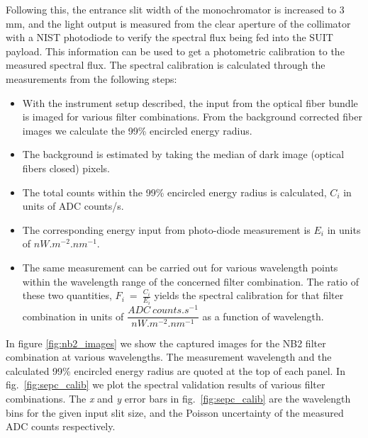 \documentclass[12pt]{spieman}  %
\begin{document}
Following this, the entrance slit width of the monochromator is increased to 3 mm, and the light output is measured from the clear aperture of the collimator with a NIST photodiode to verify the spectral flux being fed into the SUIT payload. This information can be used to get a photometric calibration to the measured spectral flux. The spectral calibration is calculated through the measurements from the following steps:

 \begin{itemize}
 \item With the instrument setup described, the input from the optical fiber bundle is imaged for various filter combinations. From the background corrected fiber images we calculate the 99\% encircled energy radius.
 \item The background is estimated by taking the median of dark image (optical fibers closed) pixels.
 \item The total counts within the 99\% encircled energy radius is calculated, $C_{i}$ in units of ADC counts/s.
 \item The corresponding energy input from photo-diode measurement is $E_{i}$ in units of $nW.m^{-2}.nm^{-1}$.
 \item The same measurement can be carried out for various wavelength points within the wavelength range of the concerned filter combination. The ratio of these two quantities, $F_{i}~=~\frac{C_{i}}{E_{i}}$ 
 yields the spectral calibration for that filter combination in units of $\dfrac{ADC~counts.s^{-1}}{nW.m^{-2}.nm^{-1}}$ as a function of wavelength.
 \end{itemize}

In figure \ref{fig:nb2_images} we show the captured images for the NB2 filter combination at various wavelengths. The measurement wavelength and the calculated 99\% encircled energy radius are quoted at the top of each panel.  In fig.~\ref{fig:sepc_calib} we plot the spectral validation results of various filter combinations. The \textit{x} and \textit{y} error bars in fig.~\ref{fig:sepc_calib} are the wavelength bins for the given input slit size, and the Poisson uncertainty of the measured ADC counts respectively.
\end{document}
